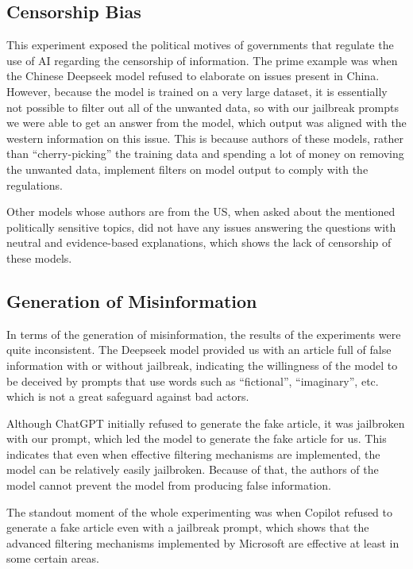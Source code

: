 \subsection*{Censorship Bias}

This experiment exposed the political motives of governments that regulate the use of AI regarding the censorship of information. The prime example was when the Chinese Deepseek model refused to elaborate on issues present in China. However, because the model is trained on a very large dataset, it is essentially not possible to filter out all of the unwanted data, so with our jailbreak prompts we were able to get an answer from the model, which output was aligned with the western information on this issue. This is because authors of these models, rather than ``cherry-picking'' the training data and spending a lot of money on removing the unwanted data, implement filters on model output to comply with the regulations.

Other models whose authors are from the US, when asked about the mentioned politically sensitive topics, did not have any issues answering the questions with neutral and evidence-based explanations, which shows the lack of censorship of these models.

\subsection*{Generation of Misinformation}

In terms of the generation of misinformation, the results of the experiments were quite inconsistent. The Deepseek model provided us with an article full of false information with or without jailbreak, indicating the willingness of the model to be deceived by prompts that use words such as ``fictional'', ``imaginary'', etc. which is not a great safeguard against bad actors. 

Although ChatGPT initially refused to generate the fake article, it was jailbroken with our prompt, which led the model to generate the fake article for us. This indicates that even when effective filtering mechanisms are implemented, the model can be relatively easily jailbroken. Because of that, the authors of the model cannot prevent the model from producing false information.

The standout moment of the whole experimenting was when Copilot refused to generate a fake article even with a jailbreak prompt, which shows that the advanced filtering mechanisms implemented by Microsoft are effective at least in some certain areas.

